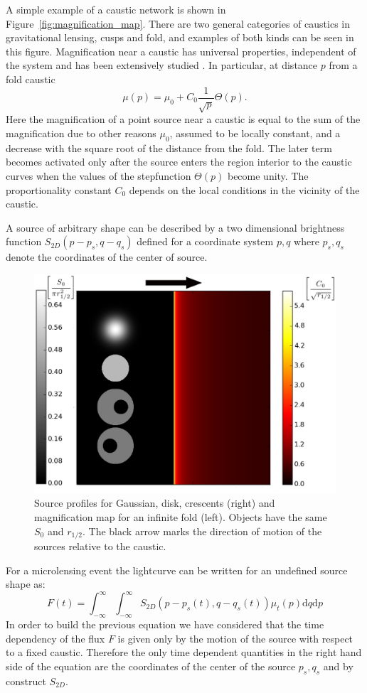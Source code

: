 A simple example of a caustic network is shown in
Figure~\ref{fig:magnification_map}.  There are two general categories
of caustics in gravitational lensing, cusps and fold, and examples of
both kinds can be seen in this figure.  Magnification near a caustic
has universal properties, independent of the system and has been
extensively studied
\citep{1986ApJ...310..568B,1992A&A...260....1S,2002ApJ...574..970G,2002ApJ...580..468G}.
In particular, at distance $p$ from a fold caustic
\begin {equation}
 \mu(p) = \mu_0 + C_0 \frac{1}{\sqrt{p}} \Theta(p).
\end {equation}
Here the magnification of a point source near a caustic is equal to
the sum of the magnification due to other reasons $\mu_0$, assumed to
be locally constant, and a decrease with the square root of the
distance from the fold. The later term becomes activated only after
the source enters the region interior to the caustic curves when the
values of the stepfunction $\Theta(p)$ become unity. The
proportionality constant $C_0$ depends on the local conditions in the
vicinity of the caustic.

A source of arbitrary shape can be described by a two dimensional brightness function $S_{2D}(p - p_s, q - q_s)$ defined for a coordinate system $p,q$ where $p_s, q_s$ denote the coordinates of the center of source.

\begin{figure}
\includegraphics[width = .49\textwidth]{plots/infinite_fold_ar.eps}
\caption{\label{fig:infinite_fold} Source profiles for Gaussian, disk,
  crescents (right) and magnification map for an infinite fold
  (left). Objects have the same $S_{0}$ and $r_{1/2}$. The black arrow marks the direction of motion of the
sources relative to the caustic.}
\end{figure}

For a microlensing event the lightcurve can be written for an
undefined source shape as:
\begin{equation}
 F(t) = \int_{-\infty}^\infty \int_{-\infty}^\infty S_{2D}(p-p_s(t), q-q_s(t)) \mu_t(p) \mathrm{d}q \mathrm{d}p
 \label{eqn:ft2d}
\end{equation}
In order to build the previous equation we have considered that the
time dependency of the flux $F$ is given only by the motion of the
source with respect to a fixed caustic. Therefore the only time
dependent quantities in the right hand side of the equation are the
coordinates of the center of the source $p_s,q_s$ and by construct
$S_{2D}$.

